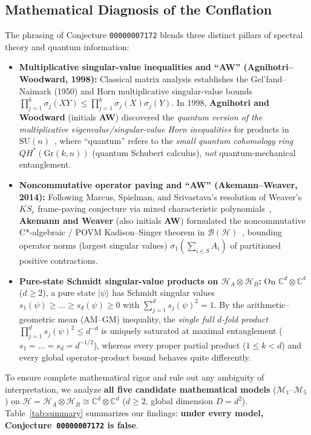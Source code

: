 \documentclass[11pt,a4paper]{article}
\theoremstyle{plain}
\theoremstyle{definition}
\newcommand{\C}{\mathbb{C}}
\newcommand{\cH}{\mathcal{H}}
\newcommand{\cB}{\mathcal{B}}
\newcommand{\SU}{\mathrm{SU}}
\begin{document}
\subsection{Mathematical Diagnosis of the Conflation}
The phrasing of Conjecture \texttt{00000007172} blends three distinct pillars of spectral theory and quantum information:
\begin{itemize}
  \item \textbf{Multiplicative singular-value inequalities and ``AW'' (Agnihotri--Woodward, 1998):} Classical matrix analysis establishes the Gel'fand--Naimark (1950) and Horn multiplicative singular-value bounds $\prod_{j=1}^k \sigma_j(XY) \le \prod_{j=1}^k \sigma_j(X)\sigma_j(Y)$. In 1998, \textbf{Agnihotri and Woodward} (initials \textbf{AW}) discovered the \emph{quantum version of the multiplicative eigenvalue/singular-value Horn inequalities} for products in $\SU(n)$~\cite{AW1998}, where ``quantum'' refers to the \emph{small quantum cohomology ring} $QH^*(\mathrm{Gr}(k,n))$ (quantum Schubert calculus), \emph{not} quantum-mechanical entanglement.
  \item \textbf{Noncommutative operator paving and ``AW'' (Akemann--Weaver, 2014):} Following Marcus, Spielman, and Srivastava's resolution of Weaver's $KS_r$ frame-paving conjecture via mixed characteristic polynomials~\cite{MSS2015}, \textbf{Akemann and Weaver} (also initials \textbf{AW}) formulated the noncommutative C*-algebraic / POVM Kadison--Singer theorem in $\cB(\cH)$~\cite{AkemannWeaver2014}, bounding operator norms (largest singular values) $\sigma_1(\sum_{i \in S} A_i)$ of partitioned positive contractions.
  \item \textbf{Pure-state Schmidt singular-value products on $\cH_A \otimes \cH_B$:} On $\C^d \otimes \C^d$ ($d \ge 2$), a pure state $|\psi\rangle$ has Schmidt singular values $s_1(\psi) \ge \dots \ge s_d(\psi) \ge 0$ with $\sum_{j=1}^d s_j(\psi)^2 = 1$. By the arithmetic--geometric mean (AM--GM) inequality, the \emph{single full $d$-fold product} $\prod_{j=1}^d s_j(\psi)^2 \le d^{-d}$ is uniquely saturated at maximal entanglement ($s_1 = \dots = s_d = d^{-1/2}$), whereas every proper partial product ($1 \le k < d$) and every global operator-product bound behaves quite differently.
\end{itemize}

To ensure complete mathematical rigor and rule out any ambiguity of interpretation, we analyze \textbf{all five candidate mathematical models} ($\mathcal{M}_1$--$\mathcal{M}_5$) on $\cH = \cH_A \otimes \cH_B \cong \C^d \otimes \C^d$ ($d \ge 2$, global dimension $D = d^2$). Table~\ref{tab:summary} summarizes our findings: \textbf{under every model, Conjecture~\texttt{00000007172} is false}.
\end{document}
